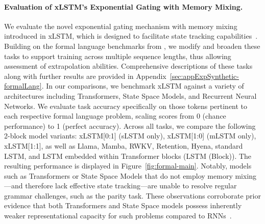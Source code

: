 \paragraph{Evaluation of xLSTM's Exponential Gating with Memory Mixing.} We evaluate the novel exponential gating mechanism with memory mixing introduced in xLSTM, which is designed to facilitate state tracking capabilities~\citep{Merrill:24, Merrill:23}. Building on the formal language benchmarks from \citet{Deletang:23}, we modify and broaden these tasks to support training across multiple sequence lengths, thus allowing assessment of extrapolation abilities. Comprehensive descriptions of these tasks along with further results are provided in Appendix~\ref{sec:appExpSynthetic-formalLang}. In our comparisons, we benchmark xLSTM against a variety of architectures including Transformers, State Space Models, and Recurrent Neural Networks. We evaluate task accuracy specifically on those tokens pertinent to each respective formal language problem, scaling scores from 0 (chance performance) to 1 (perfect accuracy). Across all tasks, we compare the following 2-block model variants: xLSTM[0:1] (sLSTM only), xLSTM[1:0] (mLSTM only), xLSTM[1:1], as well as Llama, Mamba, RWKV, Retention, Hyena, standard LSTM, and LSTM embedded within Transformer blocks (LSTM (Block)). The resulting performance is displayed in Figure~\ref{fig:formal-main}. Notably, models such as Transformers or State Space Models that do not employ memory mixing—and therefore lack effective state tracking—are unable to resolve regular grammar challenges, such as the parity task. These observations corroborate prior evidence that both Transformers and State Space models possess inherently weaker representational capacity for such problems compared to RNNs~\citep{Merrill:24, Merrill:23, Deletang:23}.

